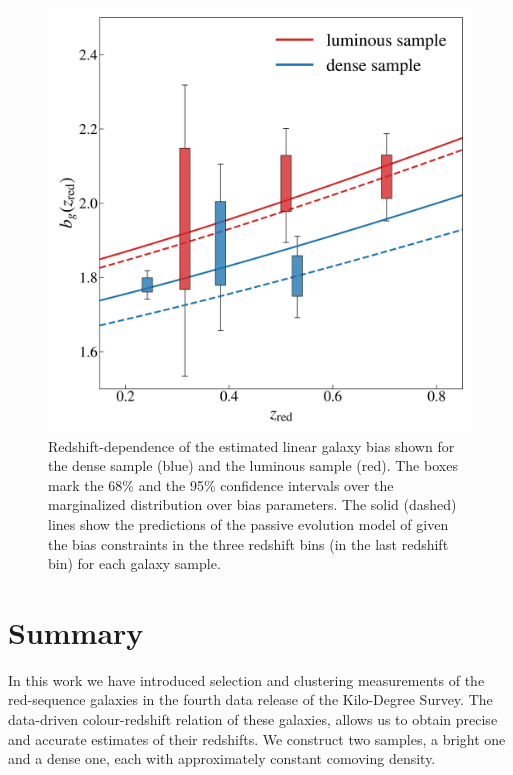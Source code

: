 \documentclass{aa}
\numberwithin{equation}{section}
\begin{document}
\begin{figure}
\includegraphics[width=\columnwidth]{figures_tmp/b_estimate_boxed.png}
\caption{ Redshift-dependence of the estimated linear galaxy bias shown for the dense sample (blue) and the luminous sample (red). The boxes mark the 68\% and the 95\% confidence intervals over the marginalized distribution over bias parameters. The solid (dashed) lines show the predictions of the passive evolution model of \citet{Fry1996} given the bias constraints in the three redshift bins (in the last redshift bin) for each galaxy sample.} 
\label{fig:b_estimate}
\end{figure}


\section{Summary}\label{sec:summary} 

In this work we have introduced selection and clustering measurements of the red-sequence galaxies in the fourth data release of the Kilo-Degree Survey. The data-driven colour-redshift relation of these galaxies, allows us to obtain precise and accurate estimates of their redshifts. We construct two samples, a bright one and a dense one, each with approximately constant comoving density.
\end{document}
